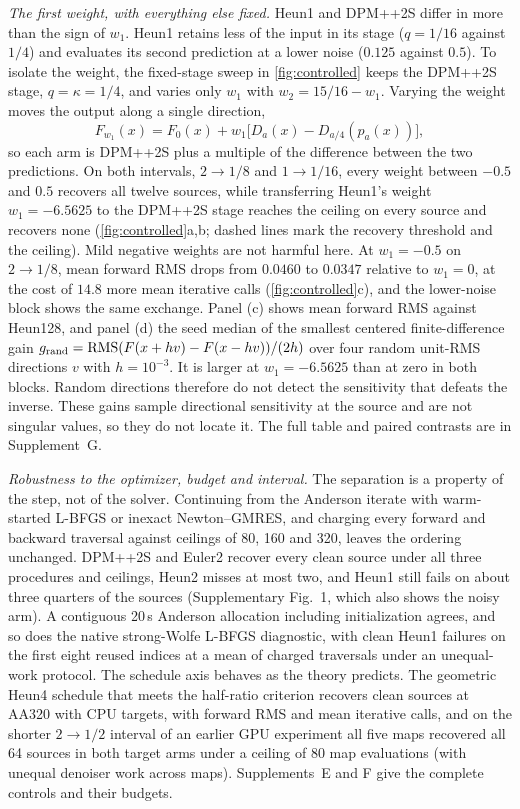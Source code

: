 \emph{The first weight, with everything else fixed.} Heun1 and DPM++2S differ in more than the sign of $w_1$. Heun1 retains less of the input in its stage ($q=1/16$ against $1/4$) and evaluates its second prediction at a lower noise ($0.125$ against $0.5$). To isolate the weight, the fixed-stage sweep in \cref{fig:controlled} keeps the DPM++2S stage, $q=\kappa=1/4$, and varies only $w_1$ with $w_2=15/16-w_1$. Varying the weight moves the output along a single direction,
\begin{equation}
 F_{w_1}(x)=F_0(x)+w_1\bigl[D_a(x)-D_{a/4}(p_a(x))\bigr],
 \label{eq:sweep}
\end{equation}
so each arm is DPM++2S plus a multiple of the difference between the two predictions. On both intervals, $2\to1/8$ and $1\to1/16$, every weight between $-0.5$ and $0.5$ recovers all twelve sources, while transferring Heun1's weight $w_1=-6.5625$ to the DPM++2S stage reaches the ceiling on every source and recovers none (\cref{fig:controlled}a,b; dashed lines mark the recovery threshold and the ceiling). Mild negative weights are not harmful here. At $w_1=-0.5$ on $2\to1/8$, mean forward RMS drops from $0.0460$ to $0.0347$ relative to $w_1=0$, at the cost of $14.8$ more mean iterative calls (\cref{fig:controlled}c), and the lower-noise block shows the same exchange. Panel (c) shows mean forward RMS against Heun128, and panel (d) the seed median of the smallest centered finite-difference gain $g_{\rm rand}=\operatorname{RMS}(F(x+hv)-F(x-hv))/(2h)$ over four random unit-RMS directions $v$ with $h=10^{-3}$. It is larger at $w_1=-6.5625$ than at zero in both blocks. Random directions therefore do not detect the sensitivity that defeats the inverse. These gains sample directional sensitivity at the source and are not singular values, so they do not locate it. The full table and paired contrasts are in Supplement~G.

\emph{Robustness to the optimizer, budget and interval.} The separation is a property of the step, not of the solver. Continuing from the Anderson iterate with warm-started L-BFGS or inexact Newton--GMRES, and charging every forward and backward traversal against ceilings of 80, 160 and 320, leaves the ordering unchanged. DPM++2S and Euler2 recover every clean source under all three procedures and ceilings, Heun2 misses at most two, and Heun1 still fails on about three quarters of the sources (Supplementary Fig.~1, which also shows the noisy arm). A contiguous 20\,s Anderson allocation including initialization agrees, and so does the native strong-Wolfe L-BFGS diagnostic, with \NativeHeunFailure{} clean Heun1 failures on the first eight reused indices at a mean of \NativeHeunWork{} charged traversals under an unequal-work protocol. The schedule axis behaves as the theory predicts. The geometric Heun4 schedule that meets the half-ratio criterion recovers \HeunFourRecovered{} clean sources at AA320 with CPU targets, with forward RMS \HeunFourFlow{} and \HeunFourWork{} mean iterative calls, and on the shorter $2\to1/2$ interval of an earlier GPU experiment all five maps recovered all 64 sources in both target arms under a ceiling of 80 map evaluations (with unequal denoiser work across maps). Supplements~E and F give the complete controls and their budgets.

